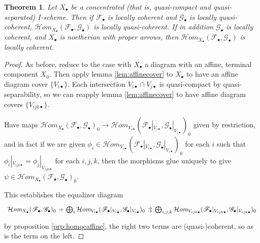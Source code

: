 \documentclass[proquest]{uwthesis}[2014/11/13]
\newtheorem{theorem}{Theorem}[section]
\theoremstyle{definition}
\newcommand{\cHom}{\mathcal{H} \textit{om}}
\newcommand{\FF}{\mathscr{F}}
\newcommand{\GG}{\mathscr{G}}
\begin{document}
\begin{theorem}
	Let $X_\bullet$ be a concentrated (that is, quasi-compact and quasi-separated) $I$-scheme. Then if $\FF_\bullet$ is locally coherent and $\GG_\bullet$ is locally quasi-coherent, $\cHom_{X_\bullet}(\FF_\bullet, \GG_\bullet)$ is locally quasi-coherent.
	If in addition $\GG_\bullet$ is locally coherent, and $X_\bullet$ is noetherian with proper arrows, then $\cHom_{X_\bullet}(\FF_\bullet, \GG_\bullet)$ is locally coherent.
\end{theorem}
\begin{proof}
	As before, reduce to the case with $X_\bullet$ a diagram with an affine, terminal component $X_0$.
	Then apply lemma \ref{lem:affinecover} to $X_\bullet$ to have an affine diagram cover $\{V_{i\bullet}\}$.
	Each intersection $V_{i \bullet} \cap V_{j \bullet}$ is quasi-compact by quasi-separability, so we can reapply lemma \ref{lem:affinecover} to have affine diagram covers $\{V_{ijk\bullet}\}$.
	
	Have maps $\cHom_{X_\bullet}(\FF_\bullet, \GG_\bullet)_0 \rightarrow \cHom_{V_{i\bullet}}(\FF_\bullet |_{V_{i\bullet}}, \GG_\bullet |_{V_{i \bullet}})_0$ given by restriction, and in fact if we are given $\phi_i \in \cHom_{V_{i\bullet}}(\FF_\bullet |_{V_{i\bullet}}, \GG_\bullet |_{V_{i \bullet}})_0$ for each $i$ such that $\phi_i |_{V_{ijk \bullet}} = \phi_j |_{V_{ijk \bullet}}$ for each $i, j, k$, then the morphisms glue uniquely to give $\psi \in \cHom_{X_\bullet}(\FF_\bullet, \GG_\bullet)_0$.
	
	This establishes the equalizer diagram
	\[
	\begin{tikzcd}[column sep=tiny]
		\cHom_{X_\bullet}(\FF_\bullet, \GG_\bullet)_0 \arrow{r} & \bigoplus_i \cHom_{V_{i\bullet}}(\FF_\bullet |_{V_{i\bullet}}, \GG_\bullet |_{V_{i \bullet}})_0 \arrow[yshift=.5ex]{r} \arrow[yshift=-.5ex]{r} & \bigoplus_{i,j,k} \cHom_{V_{ijk\bullet}}(\FF_\bullet |_{V_{ijk\bullet}}, \GG_\bullet |_{V_{ijk \bullet}})_0
	\end{tikzcd}
	\]
	by proposition \ref{prp:homqcaffine}, the right two terms are (quasi-)coherent, so as is the term on the left.
\end{proof}
\end{document}
